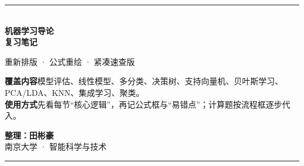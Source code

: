 \documentclass[9pt,a4paper,UTF8]{ctexart}
\begin{document}
\begin{titlepage}
\thispagestyle{empty}
\vspace*{23mm}
{\color{navy}\rule{\textwidth}{1.5pt}}\\[12mm]
{\fontsize{31}{37}\selectfont\bfseries\color{navy} 机器学习导论\\[4mm]复习笔记}\par
\vspace{7mm}
{\Large\color{teal}重新排版 · 公式重绘 · 紧凑速查版}\par
\vspace{13mm}
\begin{tcolorbox}[colback=light,colframe=teal,boxrule=0.8pt,arc=2mm,left=6mm,right=6mm,top=5mm,bottom=5mm]
\large
\textbf{覆盖内容}\quad 模型评估、线性模型、多分类、决策树、支持向量机、贝叶斯学习、PCA/LDA、KNN、集成学习、聚类。\\[2mm]
\textbf{使用方式}\quad 先看每节“核心逻辑”，再记公式框与“易错点”；计算题按流程框逐步代入。
\end{tcolorbox}
\vfill
{\large\textbf{整理：田彬豪}}\\[2mm]
{\color{teal}南京大学 · 智能科学与技术}\par
\vspace{14mm}
{\color{navy}\rule{\textwidth}{1.5pt}}
\end{titlepage}

\tableofcontents
\clearpage
\end{document}
